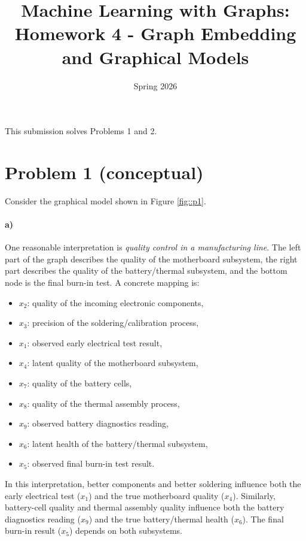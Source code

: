 \documentclass{article}
\title{Machine Learning with Graphs:\\ Homework 4 - Graph Embedding and Graphical Models}
\author{}
\date{Spring 2026}
\begin{document}
\maketitle

This submission solves Problems 1 and 2.

\section*{Problem 1 (conceptual)}

Consider the graphical model shown in Figure \ref{fig::p1}.

\paragraph{a)} One reasonable interpretation is \emph{quality control in a manufacturing line}. The left part of the graph describes the quality of the motherboard subsystem, the right part describes the quality of the battery/thermal subsystem, and the bottom node is the final burn-in test. A concrete mapping is:
\begin{itemize}
    \item $x_2$: quality of the incoming electronic components,
    \item $x_3$: precision of the soldering/calibration process,
    \item $x_1$: observed early electrical test result,
    \item $x_4$: latent quality of the motherboard subsystem,
    \item $x_7$: quality of the battery cells,
    \item $x_8$: quality of the thermal assembly process,
    \item $x_9$: observed battery diagnostics reading,
    \item $x_6$: latent health of the battery/thermal subsystem,
    \item $x_5$: observed final burn-in test result.
\end{itemize}
In this interpretation, better components and better soldering influence both the early electrical test ($x_1$) and the true motherboard quality ($x_4$). Similarly, battery-cell quality and thermal assembly quality influence both the battery diagnostics reading ($x_9$) and the true battery/thermal health ($x_6$). The final burn-in result ($x_5$) depends on both subsystems.

\newcommand{\bigCI}{\mathrel{\text{\scalebox{1.07}{$\perp\mkern-10mu\perp$}}}}
\end{document}
